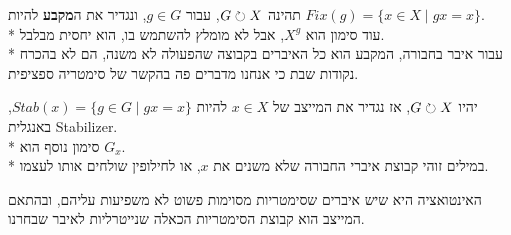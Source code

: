 \begin{definition}[מקבע]
	תהינה $G \circlearrowright X$, עבור $g \in G$, ונגדיר את ה\textbf{מקבע} להיות $ Fix(g) = \{ x \in X \mid gx = x \}$.\\*
	עוד סימון הוא $X^g$, אבל לא מומלץ להשתמש בו, הוא יחסית מבלבל. \\*
	עבור איבר בחבורה, המקבע הוא כל האיברים בקבוצה שהפעולה לא משנה, הם לא בהכרח נקודות שבת כי אנחנו מדברים פה בהקשר של סימטריה ספציפית.
\end{definition}
\begin{definition}[מייצב]
	יהיו $G \circlearrowright X$, אז נגדיר  את המייצב של $x \in X$ להיות $Stab(x) = \{ g \in G \mid g x = x \}$, באנגלית Stabilizer. \\*
	סימון נוסף הוא $G_x$. \\*
	במילים זוהי קבוצת איברי החבורה שלא משנים את $x$, או לחילופין שולחים אותו לעצמו.
\end{definition}
האינטואציה היא שיש איברים שסימטריות מסוימות פשוט לא משפיעות עליהם, ובהתאם המייצב הוא קבוצת הסימטריות הכאלה שנייטרליות לאיבר שבחרנו.

